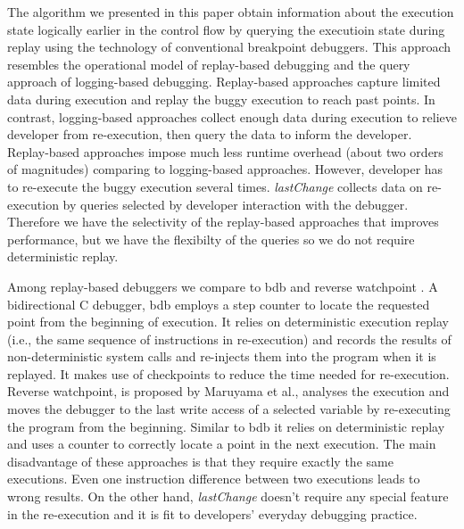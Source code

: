 \documentclass[runningheads,a4paper]{llncs}
\begin{document}
The algorithm we presented in this paper obtain information about
the execution state logically earlier in the control flow by querying 
the executioin state during replay using the technology of 
conventional breakpoint debuggers.  This
approach resembles the operational model of replay-based debugging 
and the query approach of logging-based
debugging.  Replay-based approaches capture limited data during
execution and replay the buggy execution to reach past points. In
contrast, logging-based approaches collect enough data during
execution to relieve developer from re-execution, then query the data to 
inform the developer. Replay-based
approaches impose much less runtime overhead (about two orders of
magnitudes) comparing to logging-based approaches. However, developer
has to re-execute the buggy execution several
times. \textit{lastChange} collects data on re-execution by queries
selected by developer interaction with the debugger. Therefore we have 
the selectivity of the replay-based approaches that improves performance, 
but we have the flexibilty of the queries so we do not require deterministic replay.

Among replay-based debuggers we compare to bdb \cite{Boothe} and
reverse watchpoint \cite{Maruyama}.  A bidirectional C debugger, bdb
employs a step counter to locate the requested point from the
beginning of execution. It relies on deterministic execution replay
(i.e., the same sequence of instructions in re-execution) and records
the results of non-deterministic system calls and re-injects them into
the program when it is replayed. It makes use of checkpoints to reduce
the time needed for re-execution.  Reverse watchpoint, is proposed by
Maruyama et al., analyses the execution and moves the debugger to the
last write access of a selected variable by re-executing the program
from the beginning\cite{Maruyama}.  Similar to bdb it relies on deterministic
replay and uses a counter to correctly locate a point in the next
execution. The main disadvantage of these approaches is that they require 
exactly the same executions. Even one instruction difference between
two executions leads to wrong results. On the other hand,
\textit{lastChange} doesn't require any special feature in the
re-execution and it is fit to  developers' everyday debugging
practice.
\end{document}

